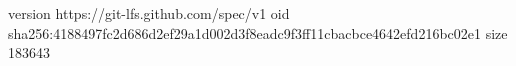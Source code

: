 version https://git-lfs.github.com/spec/v1
oid sha256:4188497fc2d686d2ef29a1d002d3f8eadc9f3ff11cbacbce4642efd216bc02e1
size 183643
